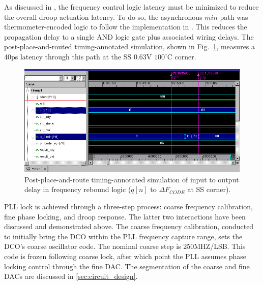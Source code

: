 \documentclass[twoside,9pt,journal,letterpage]{IEEEtran}
\begin{document}
As discussed in \cite{hashimoto2018}, the frequency control logic latency must be minimized to reduce the overall droop actuation latency. To do so, the asynchronous $min$ path was thermometer-encoded logic to follow the implementation in \cite{hashimoto2018}. This reduces the propagation delay to a single AND logic gate plus associated wiring delays. The post-place-and-routed timing-annotated simulation, shown in Fig.\ \ref{fig:freqreboundctrl_postpandr_timing}, measures a 40ps latency through this path at the SS 0.63V $100^{\circ}$C corner. 

\vspace{-7pt}
\begin{figure}[h]
	\centering
	\includegraphics[width=\columnwidth]{fig_freqreboundctrl_postpandr_timing}
	\caption{Post-place-and-route timing-annotated simulation of input to output delay in frequency rebound logic ($q[n]$ to $\Delta F_{CODE}$ at SS corner).}
	\label{fig:freqreboundctrl_postpandr_timing}
\end{figure}
\vspace{-5pt}

PLL lock is achieved through a three-step process: coarse frequency calibration, fine phase locking, and droop response. The latter two interactions have been discussed and demonstrated above. The coarse frequency calibration, conducted to initially bring the DCO within the PLL frequency capture range, sets the DCO's coarse oscillator code. The nominal coarse step is 250MHZ/LSB. This code is frozen following coarse lock, after which point the PLL assumes phase locking control through the fine DAC. The segmentation of the coarse and fine DACs are discussed in \ref{sec:circuit_design}. 

\end{document}
